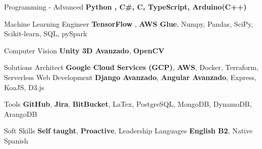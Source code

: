 

\begin{cvskills}

  \cvskill
    {Programming - Advanced} %
    {\textbf{Python , C\#, C, TypeScript, Arduino(C++)}} %

  \cvskill
    {Machine Learning Engineer}
    {\textbf{TensorFlow} , \textbf{AWS Glue}, Numpy, Pandas, SciPy, Scikit-learn, SQL, pySpark}

  \cvskill
    {Computer Vision} %
    {\textbf{Unity 3D Avanzado}, \textbf{OpenCV}} %

\cvskill
    {Solutions Architect}
    {\textbf{Google Cloud Services (GCP)}, \textbf{AWS}, Docker, Terraform, Serverless}
  \cvskill
    {Web Development} %
    {\textbf{Django Avanzado}, \textbf{Angular Avanzado}, Express, KoaJS, D3.js} %

  \cvskill
    {Tools}
    {\textbf{GitHub}, \textbf{Jira}, \textbf{BitBucket}, LaTex, PostgreSQL, MongoDB, DynamoDB, ArangoDB}

  \cvskill
    {Soft Skills}
    {\textbf{Self taught}, \textbf{Proactive}, Leadership}
  \cvskill
    {Languages} %
    {\textbf{English B2}, Native Spanish} %

\end{cvskills}
